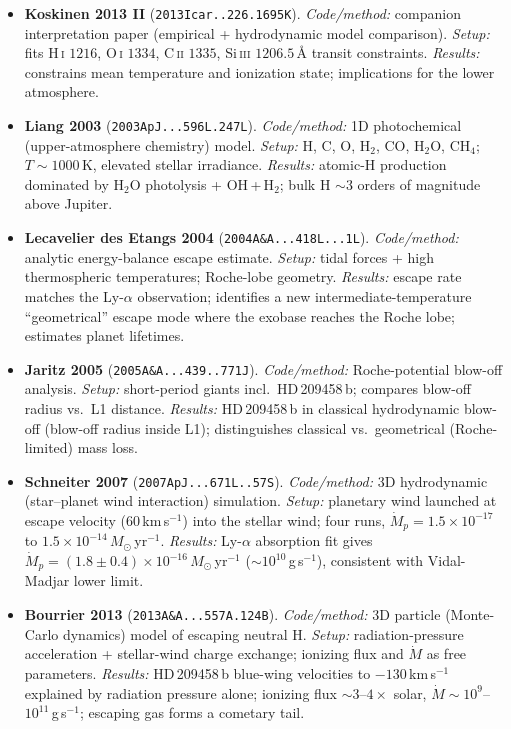 \begin{itemize}
\item \textbf{Koskinen 2013 II} (\texttt{2013Icar..226.1695K}).
\emph{Code/method:} companion interpretation paper (empirical + hydrodynamic model comparison).
\emph{Setup:} fits H\,\textsc{i} $1216$, O\,\textsc{i} $1334$, C\,\textsc{ii} $1335$, Si\,\textsc{iii} $1206.5$\,\AA{} transit constraints.
\emph{Results:} constrains mean temperature and ionization state; implications for the lower atmosphere.

\item \textbf{Liang 2003} (\texttt{2003ApJ...596L.247L}).
\emph{Code/method:} 1D photochemical (upper-atmosphere chemistry) model.
\emph{Setup:} H, C, O, H$_2$, CO, H$_2$O, CH$_4$; $T\sim1000$\,K, elevated stellar irradiance.
\emph{Results:} atomic-H production dominated by H$_2$O photolysis + OH\,+\,H$_2$; bulk H $\sim3$ orders of magnitude above Jupiter.

\item \textbf{Lecavelier des Etangs 2004} (\texttt{2004A\&A...418L...1L}).
\emph{Code/method:} analytic energy-balance escape estimate.
\emph{Setup:} tidal forces + high thermospheric temperatures; Roche-lobe geometry.
\emph{Results:} escape rate matches the Ly-$\alpha$ observation; identifies a new intermediate-temperature ``geometrical'' escape mode where the exobase reaches the Roche lobe; estimates planet lifetimes.

\item \textbf{Jaritz 2005} (\texttt{2005A\&A...439..771J}).
\emph{Code/method:} Roche-potential blow-off analysis.
\emph{Setup:} short-period giants incl.\ HD\,209458\,b; compares blow-off radius vs.\ L1 distance.
\emph{Results:} HD\,209458\,b in classical hydrodynamic blow-off (blow-off radius inside L1); distinguishes classical vs.\ geometrical (Roche-limited) mass loss.

\item \textbf{Schneiter 2007} (\texttt{2007ApJ...671L..57S}).
\emph{Code/method:} 3D hydrodynamic (star--planet wind interaction) simulation.
\emph{Setup:} planetary wind launched at escape velocity ($60$\,km\,s$^{-1}$) into the stellar wind; four runs, $\dot M_p = 1.5\times10^{-17}$ to $1.5\times10^{-14}\,M_\odot$\,yr$^{-1}$.
\emph{Results:} Ly-$\alpha$ absorption fit gives $\dot M_p=(1.8\pm0.4)\times10^{-16}\,M_\odot$\,yr$^{-1}$ ($\sim10^{10}$\,g\,s$^{-1}$), consistent with Vidal-Madjar lower limit.

\item \textbf{Bourrier 2013} (\texttt{2013A\&A...557A.124B}).
\emph{Code/method:} 3D particle (Monte-Carlo dynamics) model of escaping neutral H.
\emph{Setup:} radiation-pressure acceleration + stellar-wind charge exchange; ionizing flux and $\dot M$ as free parameters.
\emph{Results:} HD\,209458\,b blue-wing velocities to $-130$\,km\,s$^{-1}$ explained by radiation pressure alone; ionizing flux $\sim3$--$4\times$ solar, $\dot M\sim10^{9}$--$10^{11}$\,g\,s$^{-1}$; escaping gas forms a cometary tail.


\end{itemize}

